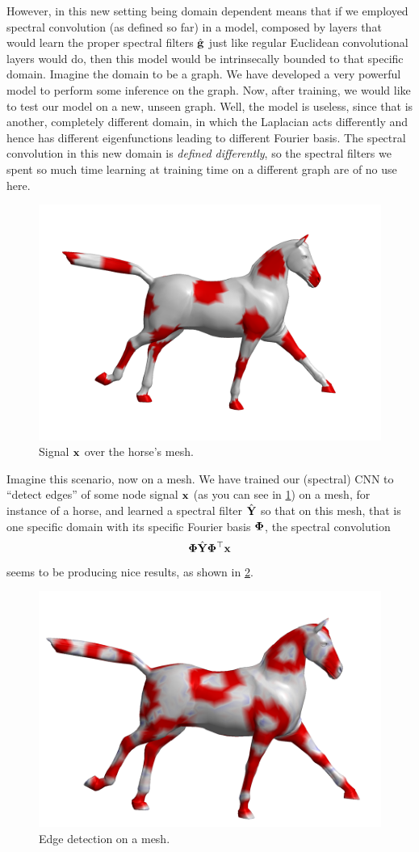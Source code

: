 However, in this new setting being domain dependent means that if we employed spectral convolution (as defined so far) in a model, composed by layers that would learn the proper spectral filters $\hat{\vb{g}}$ just like regular Euclidean convolutional layers would do, then this model would be intrinsecally bounded to that specific domain. Imagine the domain to be a graph. We have developed a very powerful model to perform some inference on the graph. Now, after training, we would like to test our model on a new, unseen graph. Well, the model is useless, since that is another, completely different domain, in which the Laplacian acts differently and hence has different eigenfunctions leading to different Fourier basis. The spectral convolution in this new domain is \emph{defined differently}, so the spectral filters we spent so much time learning at training time on a different graph are of no use here. 

\begin{figure}[H]
    \centering
    \includegraphics[width=.5\textwidth]{figures/12/horse0.png}
    \caption{Signal $\vb{x}$ over the horse's mesh.}
    \label{fig:12:4:2:horse-signal}
\end{figure}

Imagine this scenario, now on a mesh. We have trained our (spectral) CNN to ``detect edges'' of some node signal $\vb{x}$ (as you can see in \cref{fig:12:4:2:horse-signal}) on a mesh, for instance of a horse, and learned a spectral filter $\hat{\vb{Y}}$ so that on this mesh, that is one specific domain with its specific Fourier basis $\vb*{\Phi}$, the spectral convolution 
\begin{equation}
    \vb*{\Phi} \hat{\vb{Y}} \vb*{\Phi}^{\top} \vb{x}
\end{equation} 
seems to be producing nice results, as shown in \cref{fig:12:4:2:spectral-horse}.
\begin{figure}[H]
    \centering
    \includegraphics[width=.5\textwidth]{figures/12/spectral-horse.png}
    \caption{Edge detection on a mesh. }
    \label{fig:12:4:2:spectral-horse}
\end{figure}

